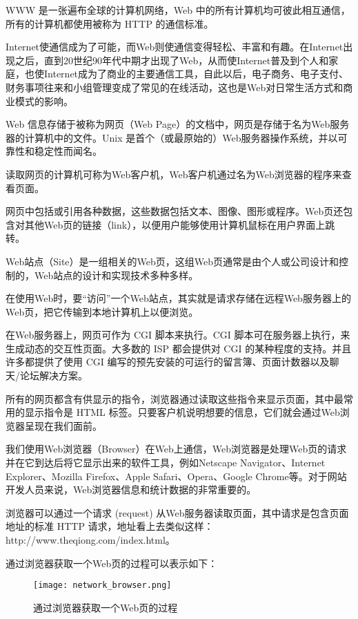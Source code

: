 WWW 是一张遍布全球的计算机网络，Web 中的所有计算机均可彼此相互通信，所有的计算机都使用被称为 HTTP 的通信标准。

Internet使通信成为了可能，而Web则使通信变得轻松、丰富和有趣。在Internet出现之后，直到20世纪90年代中期才出现了Web，从而使Internet普及到个人和家庭，也使Internet成为了商业的主要通信工具，自此以后，电子商务、电子支付、财务事项往来和小组管理变成了常见的在线活动，这也是Web对日常生活方式和商业模式的影响。

Web 信息存储于被称为网页（Web Page）的文档中，网页是存储于名为Web服务器的计算机中的文件。Unix 是首个（或最原始的）Web服务器操作系统，并以可靠性和稳定性而闻名。


读取网页的计算机可称为Web客户机，Web客户机通过名为Web浏览器的程序来查看页面。

网页中包括或引用各种数据，这些数据包括文本、图像、图形或程序。Web页还包含对其他Web页的链接（link），以便用户能够使用计算机鼠标在用户界面上跳转。

Web站点（Site）是一组相关的Web页，这组Web页通常是由个人或公司设计和控制的，Web站点的设计和实现技术多种多样。



在使用Web时，要“访问”一个Web站点，其实就是请求存储在远程Web服务器上的Web页，把它传输到本地计算机上以便浏览。

在Web服务器上，网页可作为 CGI 脚本来执行。CGI 脚本可在服务器上执行，来生成动态的交互性页面。大多数的 ISP 都会提供对 CGI 的某种程度的支持。并且许多都提供了使用 CGI 编写的预先安装的可运行的留言簿、页面计数器以及聊天/论坛解决方案。


所有的网页都含有供显示的指令，浏览器通过读取这些指令来显示页面，其中最常用的显示指令是 HTML 标签。只要客户机说明想要的信息，它们就会通过Web浏览器呈现在我们面前。



我们使用Web浏览器（Browser）在Web上通信，Web浏览器是处理Web页的请求并在它到达后将它显示出来的软件工具，例如Netscape Navigator、Internet Explorer、Mozilla Firefox、Apple Safari、Opera、Google Chrome等。对于网站开发人员来说，Web浏览器信息和统计数据的非常重要的。


浏览器可以通过一个请求 (request) 从Web服务器读取页面，其中请求是包含页面地址的标准 HTTP 请求，地址看上去类似这样：http://www.theqiong.com/index.html。


通过浏览器获取一个Web页的过程可以表示如下：

\begin{figure}[!h]
\centering
\texttt{[image: network\_browser.png]}
\caption{通过浏览器获取一个Web页的过程}
\label{network_browser}
\end{figure}


